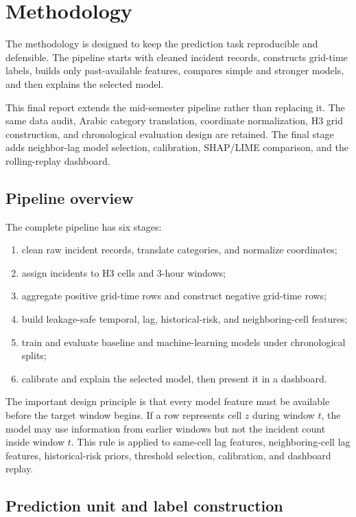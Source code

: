 \chapter{Methodology}

The methodology is designed to keep the prediction task reproducible and defensible. The pipeline starts with cleaned incident records, constructs grid-time labels, builds only past-available features, compares simple and stronger models, and then explains the selected model.

This final report extends the mid-semester pipeline rather than replacing it. The same data audit, Arabic category translation, coordinate normalization, H3 grid construction, and chronological evaluation design are retained. The final stage adds neighbor-lag model selection, calibration, SHAP/LIME comparison, and the rolling-replay dashboard.

\section{Pipeline overview}

The complete pipeline has six stages:

\begin{enumerate}
    \item clean raw incident records, translate categories, and normalize coordinates;
    \item assign incidents to H3 cells and 3-hour windows;
    \item aggregate positive grid-time rows and construct negative grid-time rows;
    \item build leakage-safe temporal, lag, historical-risk, and neighboring-cell features;
    \item train and evaluate baseline and machine-learning models under chronological splits;
    \item calibrate and explain the selected model, then present it in a dashboard.
\end{enumerate}

The important design principle is that every model feature must be available before the target window begins. If a row represents cell \(z\) during window \(t\), the model may use information from earlier windows but not the incident count inside window \(t\). This rule is applied to same-cell lag features, neighboring-cell lag features, historical-risk priors, threshold selection, calibration, and dashboard replay.

\section{Prediction unit and label construction}

